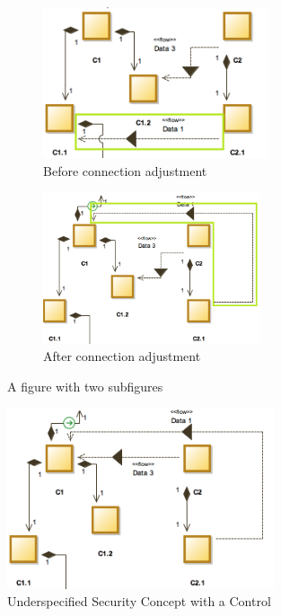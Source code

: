 \begin{figure}[H]
\centering
\begin{subfigure}{.5\textwidth}
  \centering
\includegraphics[width=0.73\textwidth]{pictures/initial}
\caption{Before connection adjustment}
\label{fig:con_c1.1}
\end{subfigure}%
\begin{subfigure}{.5\textwidth}
  \centering
\includegraphics[width=0.7\textwidth]{pictures/con_c11}
\caption{After connection adjustment}
\label{fig:con_c1.1}
\end{subfigure}
\caption{A figure with two subfigures}
\label{fig:test}
\end{figure}

\begin{figure}[H]
\centering
\includegraphics[width=0.7\textwidth]{pictures/con_c12}
\caption{Underspecified Security Concept with a Control}
\label{fig:con_c1.2}
\end{figure} 

